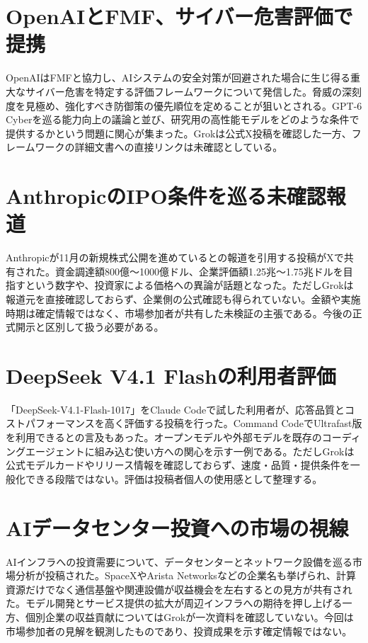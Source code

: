 \section{OpenAIとFMF、サイバー危害評価で提携}
OpenAIはFMFと協力し、AIシステムの安全対策が回避された場合に生じ得る重大なサイバー危害を特定する評価フレームワークについて発信した。脅威の深刻度を見極め、強化すべき防御策の優先順位を定めることが狙いとされる。GPT-6 Cyberを巡る能力向上の議論と並び、研究用の高性能モデルをどのような条件で提供するかという問題に関心が集まった。Grokは公式X投稿を確認した一方、フレームワークの詳細文書への直接リンクは未確認としている。

\section{AnthropicのIPO条件を巡る未確認報道}
Anthropicが11月の新規株式公開を進めているとの報道を引用する投稿がXで共有された。資金調達額800億～1000億ドル、企業評価額1.25兆～1.75兆ドルを目指すという数字や、投資家による価格への異論が話題となった。ただしGrokは報道元を直接確認しておらず、企業側の公式確認も得られていない。金額や実施時期は確定情報ではなく、市場参加者が共有した未検証の主張である。今後の正式開示と区別して扱う必要がある。

\section{DeepSeek V4.1 Flashの利用者評価}
「DeepSeek-V4.1-Flash-1017」をClaude Codeで試した利用者が、応答品質とコストパフォーマンスを高く評価する投稿を行った。Command CodeでUltrafast版を利用できるとの言及もあった。オープンモデルや外部モデルを既存のコーディングエージェントに組み込む使い方への関心を示す一例である。ただしGrokは公式モデルカードやリリース情報を確認しておらず、速度・品質・提供条件を一般化できる段階ではない。評価は投稿者個人の使用感として整理する。

\section{AIデータセンター投資への市場の視線}
AIインフラへの投資需要について、データセンターとネットワーク設備を巡る市場分析が投稿された。SpaceXやArista Networksなどの企業名も挙げられ、計算資源だけでなく通信基盤や関連設備が収益機会を左右するとの見方が共有された。モデル開発とサービス提供の拡大が周辺インフラへの期待を押し上げる一方、個別企業の収益貢献についてはGrokが一次資料を確認していない。今回は市場参加者の見解を観測したものであり、投資成果を示す確定情報ではない。
